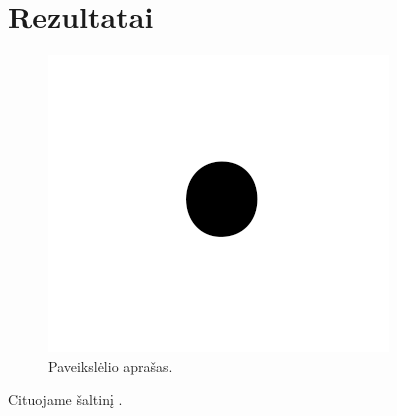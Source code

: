 \documentclass[conference]{IEEEtran}
\begin{document}
\section{Rezultatai}

\begin{figure}[ht] %
\centerline{\includegraphics{fig1.png}}
\caption{Paveikslėlio aprašas.}
\label{fig}
\end{figure}


\lipsum[2-10]






Cituojame šaltinį \cite{lecun2015deep}.



\end{document}
